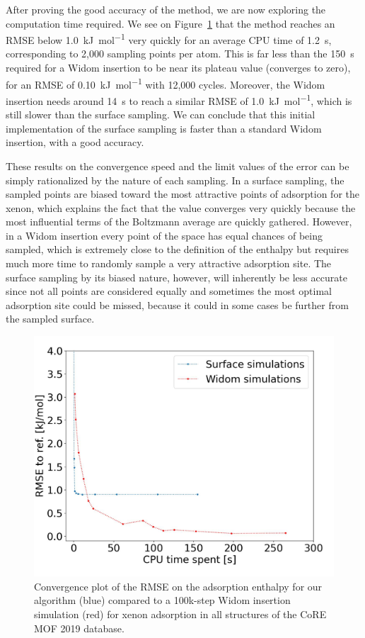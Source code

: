 \documentclass[main]{subfiles}
\begin{document}
After proving the good accuracy of the method, we are now exploring the computation time required. We see on Figure~\ref{fgr:convergence} that the method reaches an RMSE below \SI{1.0}{\kilo\joule\per\mole} very quickly for an average CPU time of \SI{1.2}{\second}, corresponding to 2,000 sampling points per atom. This is far less than the \SI{150}{\second} required for a Widom insertion to be near its plateau value (converges to zero), for an RMSE of \SI{0.10}{\kilo\joule\per\mole} with 12,000 cycles. Moreover, the Widom insertion needs around \SI{14}{\second} to reach a similar RMSE of \SI{1.0}{\kilo\joule\per\mole}, which is still slower than the surface sampling. We can conclude that this initial implementation of the surface sampling is faster than a standard Widom insertion, with a good accuracy.

These results on the convergence speed and the limit values of the error can be simply rationalized by the nature of each sampling. In a surface sampling, the sampled points are biased toward the most attractive points of adsorption for the xenon, which explains the fact that the value converges very quickly because the most influential terms of the Boltzmann average are quickly gathered. However, in a Widom insertion every point of the space has equal chances of being sampled, which is extremely close to the definition of the enthalpy but requires much more time to randomly sample a very attractive adsorption site. The surface sampling by its biased nature, however, will inherently be less accurate since not all points are considered equally and sometimes the most optimal adsorption site could be missed, because it could in some cases be further from the sampled surface. 

\begin{figure}[ht]
  \centering
    \includegraphics[width=0.7\linewidth]{figures/3-fastsim/time_rmse.jpeg}
    \caption{Convergence plot of the RMSE on the adsorption enthalpy for our algorithm (blue) compared to a 100k-step Widom insertion simulation (red) for xenon adsorption in {all} structures of the CoRE MOF 2019 database.}\label{fgr:convergence}
  \end{figure}
  
\end{document}
